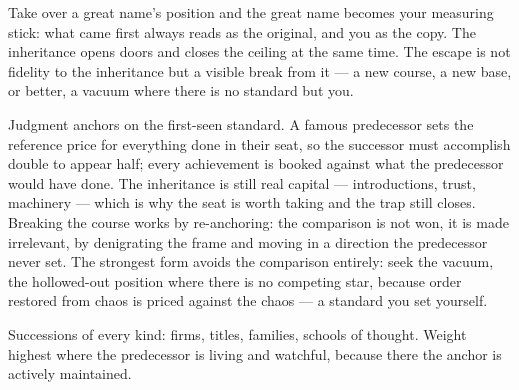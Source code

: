 


\begin{core}
Take over a great name's position and the great name becomes your measuring stick: what came first always reads as the original, and you as the copy. The inheritance opens doors and closes the ceiling at the same time. The escape is not fidelity to the inheritance but a visible break from it --- a new course, a new base, or better, a vacuum where there is no standard but you.
\end{core}

\begin{mechanism}
Judgment anchors on the first-seen standard. A famous predecessor sets the reference price for everything done in their seat, so the successor must accomplish double to appear half; every achievement is booked against what the predecessor would have done. The inheritance is still real capital --- introductions, trust, machinery --- which is why the seat is worth taking and the trap still closes. Breaking the course works by re-anchoring: the comparison is not won, it is made irrelevant, by denigrating the frame and moving in a direction the predecessor never set. The strongest form avoids the comparison entirely: seek the vacuum, the hollowed-out position where there is no competing star, because order restored from chaos is priced against the chaos --- a standard you set yourself.
\end{mechanism}

\begin{conditions}
Successions of every kind: firms, titles, families, schools of thought. Weight highest where the predecessor is living and watchful, because there the anchor is actively maintained.
\end{conditions}

